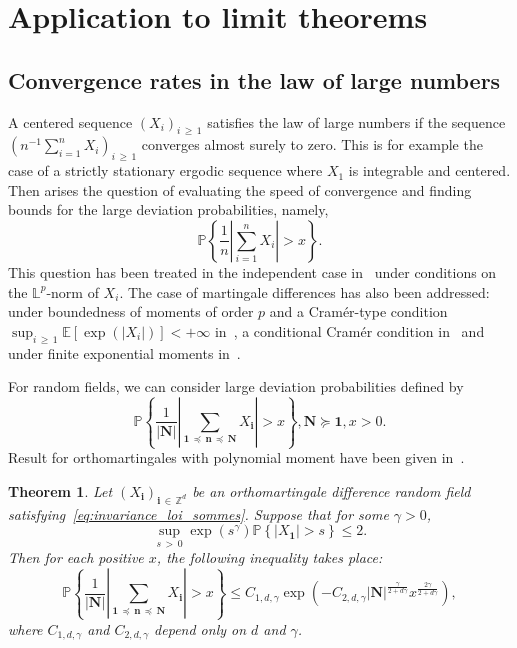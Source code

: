 \documentclass[10pt]{amsart}
\newtheorem{theo}{Theorem}[section]
\theoremstyle{definition}\newtheorem{defi}[theo]{Definition}\newtheorem{rema}[theo]{Remark}\newtheorem{exam}[theo]{Example}\newtheorem{exem}[theo]{Example}\newtheorem{nota}[theo]{Notation}
\newcommand\PP{\mathbb{P}}
\newcommand\Z{\mathbb{Z}}
\newcommand{\bbL}{\mathbb{L}}
\newcommand{\E}[1]{\mathbb E[#1]}
\newcommand\abs[1]{|#1|}
\newcommand{\pr}[1]{(#1)}
\newcommand{\gr}[1]{\bm{#1}}
\newcommand{\gri}{\bm{i}}
\newcommand{\grn}{\bm{n}}
\newcommand{\imd}{\preccurlyeq}
\newcommand{\smd}{\succcurlyeq }
\begin{document}
\section{Application to limit theorems}

\subsection{Convergence rates in the law of large numbers}\label{subsec:LLN}
A centered sequence $\pr{X_i}_{i\,\geq\,1}$ satisfies the law of large numbers if the sequence $\pr{n^{-1}\sum_{i=1}^nX_i}_{i\,\geq\,1}$ converges almost surely to zero. This is for example the case of a strictly stationary ergodic sequence where $X_1$ is integrable and centered. Then arises the question of evaluating the speed of convergence and finding bounds for the large deviation probabilities, namely,
\begin{equation}
\PP\left\{\frac 1n\left| \sum_{i=1}^nX_i\right| >x\right\}.
\end{equation}
This question has been treated in the independent case in~\cite{MR30714,MR19852,MR79851} under conditions on the $\bbL^p$-norm of $X_i$. The case of martingale differences has also been addressed: under boundedness of moments of order $p$ and a Cramér-type condition $\sup_{i\,\geq\,1}\E{\exp\pr{\abs{X_i}}}<+\infty$ in~\cite{MR1856684}, a conditional Cramér condition in~\cite{MR2568267} and under finite exponential moments in~\cite{MR3005732}.

For random fields, we can consider large deviation probabilities defined by
\begin{equation}
\PP\left\{\frac 1{\left|\gr{N}\right|}\left| \sum_{\gr{1}\,\imd
\,\grn\,\imd\,\gr{N}} X_{\gri}\right| >x\right\}, \gr{N} \smd\gr{1}, x>0.
\end{equation}
Result for orthomartingales with polynomial moment have been given in~\cite{MR4046858,MR2794415,MR3451971}.

\begin{theo}\label{thm:large_deviation}
Let $\pr{X_{\gri}}_{\gri\,\in\,\Z^d}$ be an orthomartingale difference random field satisfying~\eqref{eq:invariance_loi_sommes}. Suppose that for some $\gamma>0$,
\begin{equation}
\sup_{s\,>\,0}\exp\left(s^\gamma\right)\PP\left\{\left|X_{\gr{1}}\right|>s\right\}\leq 2.
\end{equation}
Then for each positive $x$, the following inequality takes place:
\begin{equation}
\PP\left\{\frac 1{\left|\gr{N}\right|}\left| \sum_{\gr{1}\,\imd\,
\gr{n}\,\imd\,\gr{N}} X_{\gri}\right| >x\right\}\leq C_{1,d,\gamma}\exp\left(-C_{2,d,\gamma}
\left|\gr{N}\right|^{\frac{\gamma}{2+d\gamma}}x^{\frac{2\gamma}{2+d\gamma}} \right),
\end{equation}
where $C_{1,d,\gamma}$ and $C_{2,d,\gamma}$ depend only on $d$ and $\gamma$.
\end{theo}
\end{document}

